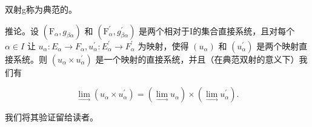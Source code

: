 双射g称为典范的。

推论。设 \((\mathrm{F}_{\alpha}, g_{\beta\alpha})\) 和 \((\mathrm{F}_{\alpha}^{\prime}, g_{\beta\alpha}^{\prime})\) 是两个相对于I的集合直接系统，且对每个 \(\alpha \in I\) 让 \(u_{\alpha}: E_{\alpha} \to F_{\alpha}, u_{\alpha}^{\prime}: E_{\alpha}^{\prime} \to F_{\alpha}^{\prime}\) 为映射，使得 \((u_{\alpha})\) 和 \((u_{\alpha}^{\prime})\) 是两个映射直接系统。则 \((u_{\alpha} \times u_{\alpha}^{\prime})\) 是一个映射的直接系统，并且（在典范双射的意义下）我们有

\[
\lim _ {\rightarrow} \left(u _ {\alpha} \times u _ {\alpha} ^ {\prime}\right) = (\lim _ {\rightarrow} u _ {\alpha}) \times (\lim _ {\rightarrow} u _ {\alpha} ^ {\prime}).\tag{35}
\]

我们将其验证留给读者。

